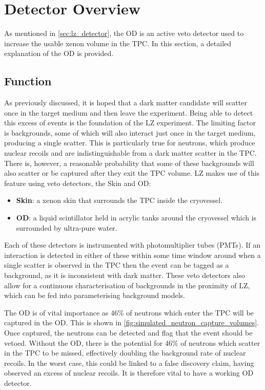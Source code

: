 \section{Detector Overview} \label{OD_detector_overview}
\par
As mentioned in \autoref{sec:lz_detector}, the OD is an active veto detector used to increase the usable xenon volume in the TPC.
In this section, a detailed explanation of the OD is provided.

\subsection{Function}
\par
As previously discussed, it is hoped that a dark matter candidate will scatter once in the target medium and then leave the experiment.
Being able to detect this excess of events is the foundation of the LZ experiment.
The limiting factor is backgrounds, some of which will also interact just once in the target medium, producing a single scatter.
This is particularly true for neutrons, which produce nuclear recoils and are indistinguishable from a dark matter scatter in the TPC.
There is, however, a reasonable probability that some of these backgrounds will also scatter or be captured after they exit the TPC volume.
LZ makes use of this feature using veto detectors, the Skin and OD:
\begin{itemize}
    \item \textbf{Skin}: a xenon skin that surrounds the TPC inside the cryovessel.
    \item \textbf{OD}: a liquid scintillator held in acrylic tanks around the cryovessel which is surrounded by ultra-pure water.
\end{itemize}
Each of these detectors is instrumented with photomultiplier tubes (PMTs).
If an interaction is detected in either of these within some time window around when a single scatter is observed in the TPC then the event can be tagged as a background, as it is inconsistent with dark matter.
These veto detectors also allow for a continuous characterisation of backgrounds in the proximity of LZ, which can be fed into parameterising background models.

\par
The OD is of vital importance as 46\% of neutrons which enter the TPC will be captured in the OD.
This is shown in \autoref{fig:simulated_neutron_capture_volumes}.
Once captured, the neutrons can be detected and flag that the event should be vetoed. 
Without the OD, there is the potential for 46\% of neutrons which scatter in the TPC to be missed, effectively doubling the background rate of nuclear recoils.
In the worst case, this could be linked to a false discovery claim, having observed an excess of nuclear recoils.
It is therefore vital to have a working OD detector.

